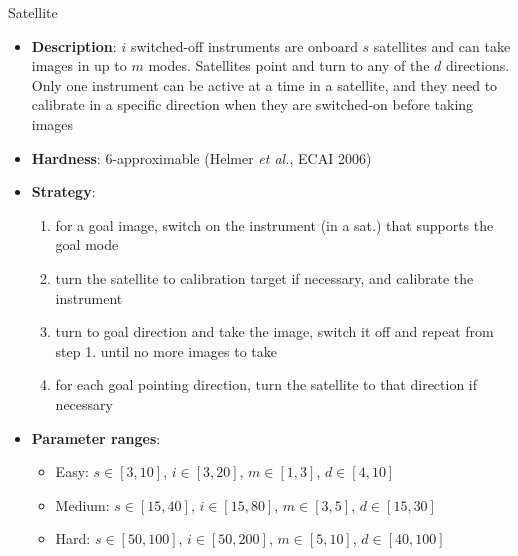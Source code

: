 \documentclass[aspectratio=169,xcolor=dvipsnames]{beamer}
\begin{document}
\begin{frame}{Satellite}

    \begin{itemize}
        \item \textbf{Description}: $i$ switched-off instruments are onboard $s$ satellites and can take images in up to $m$ modes. Satellites point and turn to any of the $d$ directions. Only one instrument can be active at a time in a satellite, and they need to calibrate in a specific direction when they are switched-on before taking images
        \item \textbf{Hardness}: $6$-approximable (Helmer \textit{et al.}, ECAI 2006)
        \item \textbf{Strategy}:
        \begin{enumerate}
            \item for a goal image, switch on the instrument (in a sat.) that supports the goal mode
            \item turn the satellite to calibration target if necessary, and calibrate the instrument
            \item turn to goal direction and take the image, switch it off and repeat from step 1. until no more images to take
            \item for each goal pointing direction, turn the satellite to that direction if necessary
        \end{enumerate}
        \item \textbf{Parameter ranges}:
        \begin{itemize}
            \item Easy: $s\in[3, 10]$, $i\in[3,20]$, $m\in[1, 3]$, $d\in[4, 10]$
            \item Medium: $s\in[15, 40]$, $i\in[15,80]$, $m\in[3, 5]$, $d\in[15, 30]$
            \item Hard: $s\in[50, 100]$, $i\in[50,200]$, $m\in[5, 10]$, $d\in[40, 100]$
        \end{itemize}
    \end{itemize}

\end{frame}
\end{document}
